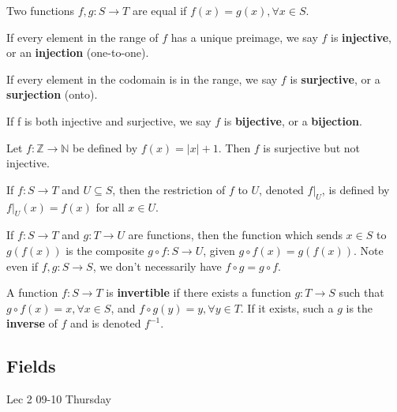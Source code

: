 \documentclass[12pt]{article}
\newcommand{\lecdate}[1]{ %
    \vspace{0in}
    \begin{flushright}
        #1
    \end{flushright}
    \vspace{0in}
}
\begin{document}
\begin{defn}
    Two functions $f, g : S \to T$ are equal if $f (x) = g(x), \forall x \in S$.
\end{defn}

\begin{defn}
    If every element in the range of $f$ has a unique preimage, we say $f$ is \textbf{injective}, or an \textbf{injection} (one-to-one).
\end{defn}

\begin{defn}
    If every element in the codomain is in the range, we say $f$ is \textbf{surjective}, or a \textbf{surjection} (onto).
\end{defn}

\begin{defn}
    If f is both injective and surjective, we say $f$ is \textbf{bijective}, or a \textbf{bijection}.
\end{defn}
\begin{ex}
    Let $f: \mathbb{Z} \to \mathbb{N}$ be defined by $f(x) = |x| + 1$. Then $f$ is surjective but not injective.
\end{ex}

\begin{defn}
    If $f: S \to T$ and $U \subseteq S$, then the restriction of $f$ to $U$, denoted $f\rvert_{U}$, is defined by $f\rvert_{U}(x) = f (x)$ for all $x \in U$.
\end{defn}

\begin{defn}
    If $f: S \to T$ and $g : T \to U$ are functions, then the function which sends $x \in S$ to $g(f (x))$ is the composite $g \circ f : S \to U$, given $g \circ f (x) = g(f (x))$. Note even if $f, g : S \to S$, we don't necessarily have $f \circ g = g \circ f$.
\end{defn}

\begin{defn}
    A function $f : S \to T$ is \textbf{invertible} if there exists a function $g : T \to S$ such that $g \circ f (x) = x, \forall x \in S$, and $f \circ g(y) = y, \forall y \in T$. If it exists, such a $g$ is the \textbf{inverse} of $f$ and is denoted $f^{-1}$.
\end{defn}

\subsection{Fields}
\lecdate{Lec 2 09-10 Thursday}
\end{document}
